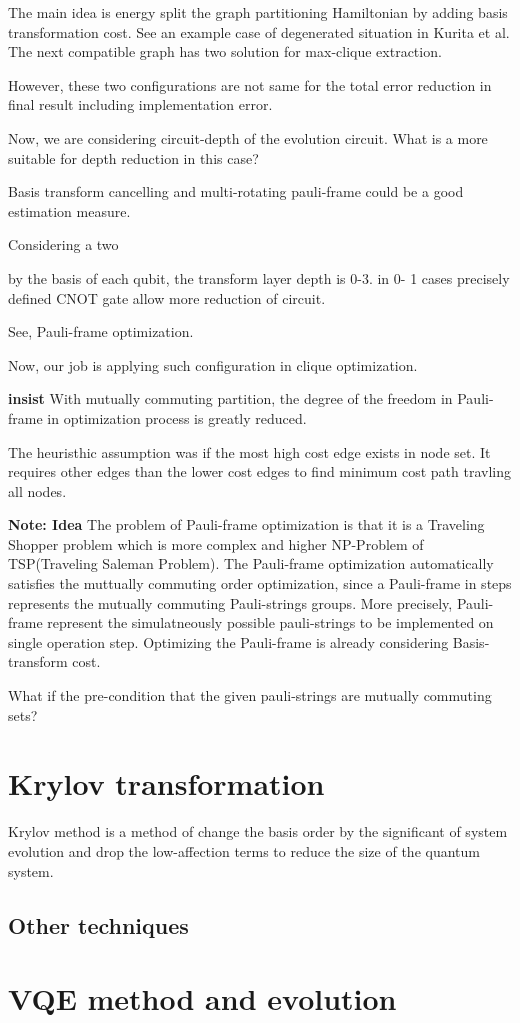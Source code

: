 The main idea is energy split the graph partitioning Hamiltonian by adding basis transformation cost.
See an example case of degenerated situation in Kurita et al.
The next compatible graph has two solution for max-clique extraction.

However, these two configurations are not same 
for the total error reduction in final result including implementation error.

Now, we are considering circuit-depth of the evolution circuit.
What is a more suitable for depth reduction in this case?

Basis transform cancelling and multi-rotating pauli-frame could be a good
estimation measure.

Considering a two 

by the basis of each qubit, the transform layer depth is 0-3.
in 0- 1 cases precisely defined CNOT gate allow more reduction of circuit.

See, Pauli-frame optimization.

Now, our job is applying such configuration in clique optimization.


\textbf{insist} With mutually commuting partition, the degree of the freedom in 
Pauli-frame in optimization process is greatly reduced.


The heuristhic assumption was if the most high cost edge exists in node set. 
It requires other edges than the lower cost edges to find minimum cost path travling all nodes.



\textbf{Note: Idea}
The problem of Pauli-frame optimization is that it is a Traveling Shopper problem which is more complex and higher 
NP-Problem of TSP(Traveling Saleman Problem).
The Pauli-frame optimization automatically satisfies the muttually commuting order optimization, since 
a Pauli-frame in steps represents the mutually commuting Pauli-strings groups. 
More precisely, Pauli-frame represent the simulatneously possible pauli-strings 
to be implemented on single operation step. 
Optimizing the Pauli-frame is already considering Basis-transform cost.


What if the pre-condition that the given pauli-strings are mutually commuting sets?

\section{Krylov transformation}

Krylov method is a method of change the basis order by the significant of system evolution and drop the low-affection terms to reduce the size of the quantum system.

\subsection{Other techniques}

\section{VQE method and evolution}